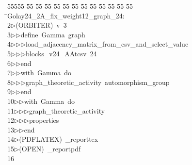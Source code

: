 %
%
\begin{tabbing}
55555 \= 55 \= 55 \= 55 \= 55 \= 55 \= 55 \= 55 \= 55 \= 55 \= 55 \= 55 \= 55 \= \>Golay24\_2A\_fix\_weight12\_graph\_24:\\[0pt]
2\>$\triangleright$\>(ORBITER)\ v\ 3\ \\[0pt]
3\>$\triangleright$\>$\triangleright$\>define\ Gamma\ graph\ \\[0pt]
4\>$\triangleright$\>$\triangleright$\>$\triangleright$\>load\_adjacency\_matrix\_from\_csv\_and\_select\_value\ \\[0pt]
5\>$\triangleright$\>$\triangleright$\>$\triangleright$\>blocks\_v24\_AAtcsv\ 24\ \\[0pt]
6\>$\triangleright$\>$\triangleright$\>end\ \\[0pt]
7\>$\triangleright$\>$\triangleright$\>with\ Gamma\ do\ \\[0pt]
8\>$\triangleright$\>$\triangleright$\>$\triangleright$\>graph\_theoretic\_activity\ automorphism\_group\ \\[0pt]
9\>$\triangleright$\>$\triangleright$\>end\ \\[0pt]
10\>$\triangleright$\>$\triangleright$\>with\ Gamma\ do\ \\[0pt]
11\>$\triangleright$\>$\triangleright$\>$\triangleright$\>graph\_theoretic\_activity\ \\[0pt]
12\>$\triangleright$\>$\triangleright$\>$\triangleright$\>properties\ \\[0pt]
13\>$\triangleright$\>$\triangleright$\>end\\[0pt]
14\>$\triangleright$\>(PDFLATEX)\ \_reporttex\\[0pt]
15\>$\triangleright$\>(OPEN)\ \_reportpdf\\[0pt]
16\>\end{tabbing}
